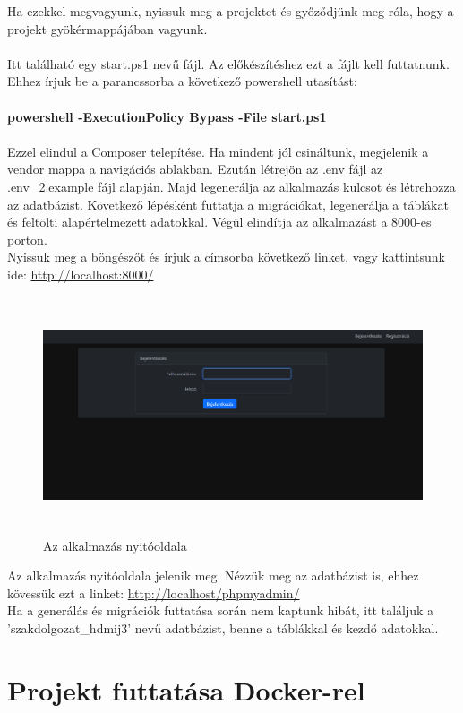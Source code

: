 \documentclass[
]{thesis-ekf}
\theoremstyle{definition}
\theoremstyle{remark}
\begin{document}
Ha ezekkel megvagyunk, nyissuk meg a projektet és győződjünk meg róla, hogy a projekt gyökérmappájában vagyunk.
\\\\
Itt található egy start.ps1 nevű fájl. Az előkészítéshez ezt a fájlt kell futtatnunk. Ehhez írjuk be a parancssorba a következő powershell utasítást:
\\\\
\textbf{powershell -ExecutionPolicy Bypass -File start.ps1}
\\\\
Ezzel elindul a Composer telepítése. Ha mindent jól csináltunk, megjelenik a vendor mappa a navigációs ablakban. Ezután létrejön az .env fájl az .env\_2.example fájl alapján. Majd legenerálja az alkalmazás kulcsot és létrehozza az adatbázist. Következő lépésként futtatja a migrációkat, legenerálja a táblákat és feltölti alapértelmezett adatokkal. Végül elindítja az alkalmazást a 8000-es porton.
\\
Nyissuk meg a böngészőt és írjuk a címsorba következő linket, vagy kattintsunk ide: \url{http://localhost:8000/}
\begin{figure}[H]
	\centering
	\includegraphics[width=13cm, height=7cm]{8000}
	\caption{Az alkalmazás nyitóoldala}
	\label{fig:picture}
\end{figure}
\noindent
Az alkalmazás nyitóoldala jelenik meg. Nézzük meg az adatbázist is, ehhez kövessük ezt a linket: \url{http://localhost/phpmyadmin/}
\\
Ha a generálás és migrációk futtatása során nem kaptunk hibát, itt találjuk a 'szakdolgozat\_hdmij3' nevű adatbázist, benne a táblákkal és kezdő adatokkal.

\section{Projekt futtatása Docker-rel}
\end{document}
